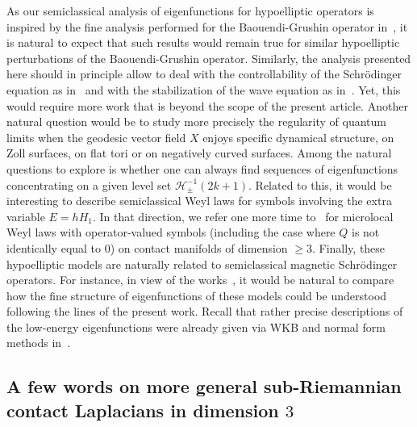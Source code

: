 \documentclass[10pt]{amsart}
\theoremstyle{plain}
\theoremstyle{definition}
\theoremstyle{remark}
\begin{document}
As our semiclassical analysis of eigenfunctions for hypoelliptic operators is inspired by the fine analysis performed for the Baouendi-Grushin operator in~\cite{BurqSun22, ArnaizSun22}, it is natural to expect that such results would remain true for similar hypoelliptic perturbations of the Baouendi-Grushin operator. Similarly, the analysis presented here should in principle allow to deal with the controllability of the Schrödinger equation as in~\cite{BurqSun22} and with the stabilization of the wave equation as in~\cite{ArnaizSun22}. Yet, this would require more work that is beyond the scope of the present article. Another natural question would be to study more precisely the regularity of quantum limits when the geodesic vector field $X$ enjoys specific dynamical structure, \eg on Zoll surfaces, on flat tori or on negatively curved surfaces. Among the natural questions to explore is whether one can always find sequences of eigenfunctions concentrating on a given level set $\mathcal{H}_\pm^{-1}(2k+1)$. Related to this, it would be interesting to describe semiclassical Weyl laws for symbols involving the extra variable $E=hH_1$. In that direction, we refer one more time to~\cite{Taylor20} for microlocal Weyl laws with operator-valued symbols (including the case where $Q$ is not identically equal to $0$) on contact manifolds of dimension $\geq 3$. Finally, these hypoelliptic models are naturally related to semiclassical magnetic Schrödinger operators. For instance, in view of the works~\cite{RaymondVuNgoc15, HelfferKordyukovRaymondVuNgoc16, Morin19, Morin20}, it would be natural to compare how the fine structure of eigenfunctions of these models could be understood following the lines of the present work. Recall that rather precise descriptions of the low-energy eigenfunctions were already given via WKB and normal form methods in~\cite{BonthonneauRaymond20, GuedesBonthonneauRaymondVuNgoc21, GuedesBonthonneauNguyenRaymondVuNgoc21}.

\subsection{A few words on more general sub-Riemannian contact Laplacians in dimension $3$}\label{ss:general-contact}
\end{document}
